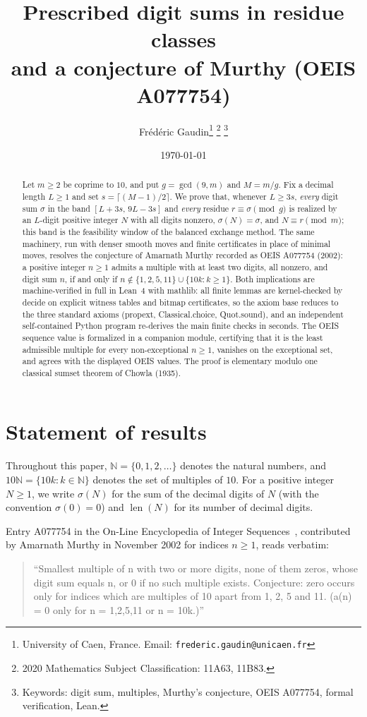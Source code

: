 \documentclass[11pt]{article}
\title{Prescribed digit sums in residue classes\\
\large and a conjecture of Murthy (OEIS A077754)}
\author{Fr\'ed\'eric Gaudin\thanks{University of Caen, France.
Email: \texttt{frederic.gaudin@unicaen.fr}}%
\thanks{2020 Mathematics Subject Classification: 11A63, 11B83.}%
\thanks{Keywords: digit sum, multiples, Murthy's conjecture,
OEIS A077754, formal verification, Lean.}}
\date{\today}
\theoremstyle{remark}
\newcommand{\N}{\mathbb{N}}
\newcommand{\sig}{\sigma}
\begin{document}
\maketitle

\begin{abstract}
Let $m \ge 2$ be coprime to $10$, and put $g = \gcd(9,m)$ and $M = m/g$.
Fix a decimal length $L \ge 1$ and set $s = \lceil (M-1)/2 \rceil$. We prove that,
whenever $L \ge 3s$, \emph{every} digit sum $\sig$ in the band
$[L+3s,\,9L-3s]$ and \emph{every} residue $r \equiv \sig \pmod g$ is realized
by an $L$-digit positive integer $N$ with all digits nonzero, $\sig(N)=\sig$,
and $N \equiv r \pmod m$; this band is the feasibility window of the balanced
exchange method. The same machinery, run with denser smooth
moves and finite certificates in place of minimal moves, resolves the
conjecture of Amarnath Murthy recorded as OEIS A077754 (2002): a positive
integer $n \ge 1$ admits a multiple with at least two digits, all nonzero,
and digit sum $n$, if and only
if $n \notin \{1,2,5,11\} \cup \{10k : k \ge 1\}$. Both implications are
machine-verified in full in Lean~4 with mathlib: all
finite lemmas are kernel-checked by decide on explicit witness tables
and bitmap certificates, so the axiom base reduces to the three standard axioms
(propext, Classical.choice, Quot.sound), and an
independent self-contained Python program re-derives the main finite checks
in seconds. The OEIS sequence value
is formalized in a companion module, certifying that it is
the least admissible multiple for every non-exceptional $n \ge 1$, vanishes
on the exceptional set, and agrees with the displayed OEIS values. The proof is
elementary modulo one classical sumset theorem of Chowla (1935).
\end{abstract}

\section{Statement of results}

Throughout this paper, $\N = \{0,1,2,\dots\}$ denotes the natural numbers, and
$10\N = \{10k : k \in \N\}$ denotes the set of multiples of $10$. For a
positive integer $N \ge 1$, we write $\sig(N)$ for the sum of the decimal
digits of $N$ (with the convention $\sig(0) = 0$) and
$\operatorname{len}(N)$ for its number of decimal digits.

Entry A077754 in the On-Line Encyclopedia of Integer Sequences~\cite{oeis},
contributed by Amarnath Murthy in November 2002 for indices $n \ge 1$, reads
verbatim:
\begin{quote}
``Smallest multiple of n with two or more digits, none of them zeros, whose
digit sum equals n, or 0 if no such multiple exists. Conjecture: zero occurs
only for indices which are multiples of 10 apart from 1, 2, 5 and 11.
(a(n) = 0 only for n = 1,2,5,11 or n = 10k.)''
\end{quote}
\end{document}
